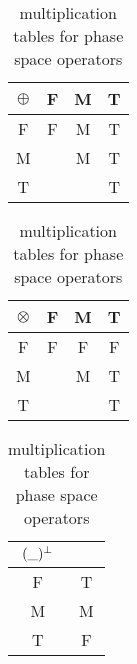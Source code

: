 \begin{table}[hbt]
\begin{center}
   \begin{tabular}{c|ccc}
  $\oplus$ & F &  M  & T \\ \hline
  F   &  F & M  & T   \\
  M  &     & M  & T   \\
  T   &     &     & T   \\
  \end{tabular}
\hskip 36pt\begin{tabular}{c|ccc}
  $\otimes$ & F  & M & T \\ \hline
        F   & F & F & F \\
        M   &   & M & T \\
        T   &   &     & T \\
  \end{tabular}
\hskip 36pt
 \begin{tabular}{c|c}
 ${(\_)^{\bot}}$ &  \\ \hline
F & T \\
M & M \\
T & F \\
 \end{tabular}
\end{center}
\caption{multiplication tables for phase space operators}
\label{table:interpretation3}
\end{table}








